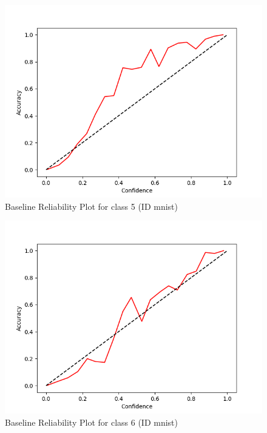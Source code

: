 \documentclass[11pt]{article}
\begin{document}
\begin{figure}[htbp]
\centering
\includegraphics[width=.9\linewidth]{./base_mnist_rel_5.png}
\caption{\label{fig:org9f9deca}
Baseline Reliability Plot for class 5 (ID mnist)}
\end{figure}

\begin{figure}[htbp]
\centering
\includegraphics[width=.9\linewidth]{./base_mnist_rel_6.png}
\caption{\label{fig:org260d8e7}
Baseline Reliability Plot for class 6 (ID mnist)}
\end{figure}
\end{document}
